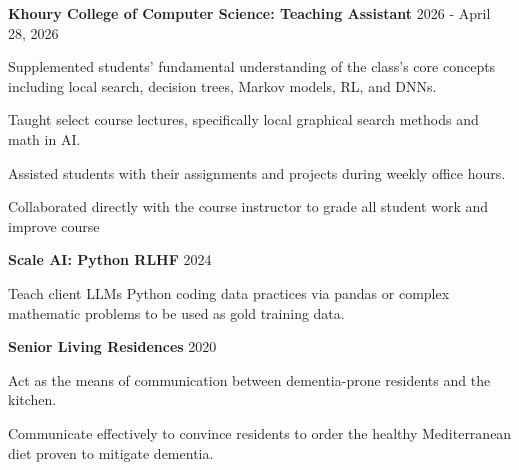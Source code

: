 \textbf{Khoury College of Computer Science: Teaching Assistant} \hfill 2026 - April 28, 2026 \\
\begin{zitemize}
    \item Supplemented students’ fundamental understanding of the class’s core concepts including local search, decision trees, Markov models, RL, and DNNs.
    \item Taught select course lectures, specifically local graphical search methods and math in AI.
    \item Assisted students with their assignments and projects during weekly office hours.
    \item Collaborated directly with the course instructor to grade all student work and improve course

\end{zitemize}

\textbf{Scale AI: Python RLHF} \hfill 2024 \\
\begin{zitemize}
    \item Teach client LLMs Python coding data practices via pandas or complex mathematic problems to be used as gold training data. 
\end{zitemize}

\textbf{Senior Living Residences} \hfill 2020\\
\begin{zitemize}
    \item Act as the means of communication between dementia-prone residents and the kitchen. 
    \item Communicate effectively to convince residents to order the healthy Mediterranean diet proven to mitigate dementia.  
\end{zitemize}
 
